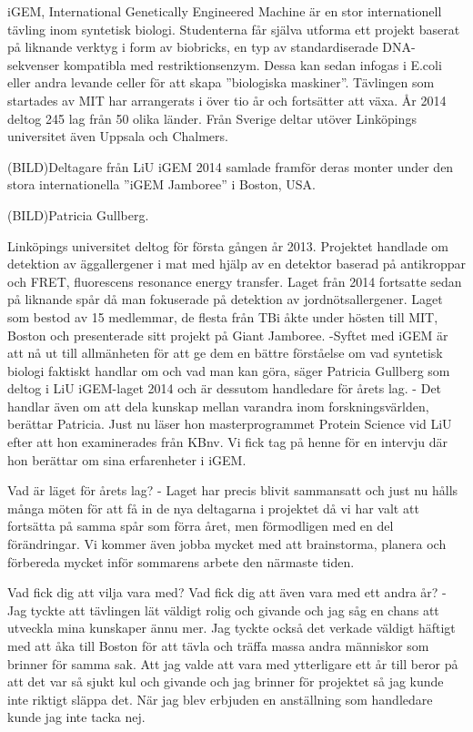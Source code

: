 


iGEM, International Genetically Engineered Machine är en stor internationell tävling inom syntetisk biologi. Studenterna får själva utforma ett projekt baserat på liknande verktyg i form av biobricks, en typ av standardiserade DNA-sekvenser kompatibla med restriktionsenzym. Dessa kan sedan infogas i E.coli eller andra levande celler för att skapa ”biologiska maskiner”. Tävlingen som startades av MIT har arrangerats i över tio år och fortsätter att växa. År 2014 deltog 245 lag från 50 olika länder. Från Sverige deltar utöver Linköpings universitet även Uppsala och Chalmers.



(BILD)Deltagare från LiU iGEM 2014 samlade framför deras monter under den stora internationella ”iGEM Jamboree” i Boston, USA. 

(BILD)Patricia Gullberg.


Linköpings universitet deltog för första gången år 2013. Projektet handlade om detektion av äggallergener i mat med hjälp av en detektor baserad på antikroppar och FRET, fluorescens resonance energy transfer. Laget från 2014 fortsatte sedan på liknande spår då man fokuserade på detektion av jordnötsallergener. Laget som bestod av 15 medlemmar, de flesta från TBi åkte under hösten till MIT, Boston och presenterade sitt projekt på Giant Jamboree. 
-Syftet med iGEM är att nå ut till allmänheten för att ge dem en bättre förståelse om vad syntetisk biologi faktiskt handlar om och vad man kan göra, säger Patricia Gullberg som deltog i LiU iGEM-laget 2014 och är dessutom handledare för årets lag.
- Det handlar även om att dela kunskap mellan varandra inom forskningsvärlden, berättar Patricia. Just nu läser hon masterprogrammet Protein Science vid LiU efter att hon examinerades från KBnv. Vi fick tag på henne för en intervju där hon berättar om sina erfarenheter i iGEM. 


Vad är läget för årets lag?
- Laget har precis blivit sammansatt och just nu hålls många möten för att få in de nya deltagarna i projektet då vi har valt att fortsätta på samma spår som förra året, men förmodligen med en del förändringar. Vi kommer även jobba mycket med att brainstorma, planera och förbereda mycket inför sommarens arbete den närmaste tiden.

Vad fick dig att vilja vara med? Vad fick dig att även vara med ett andra år?
- Jag tyckte att tävlingen lät väldigt rolig och givande och jag såg en chans att utveckla mina kunskaper ännu mer. Jag tyckte också det verkade väldigt häftigt med att åka till Boston för att tävla och träffa massa andra människor som brinner för samma sak. Att jag valde att vara med ytterligare ett år till beror på att det var så sjukt kul och givande och jag brinner för projektet så jag kunde inte riktigt släppa det. När jag blev erbjuden en anställning som handledare kunde jag inte tacka nej.

